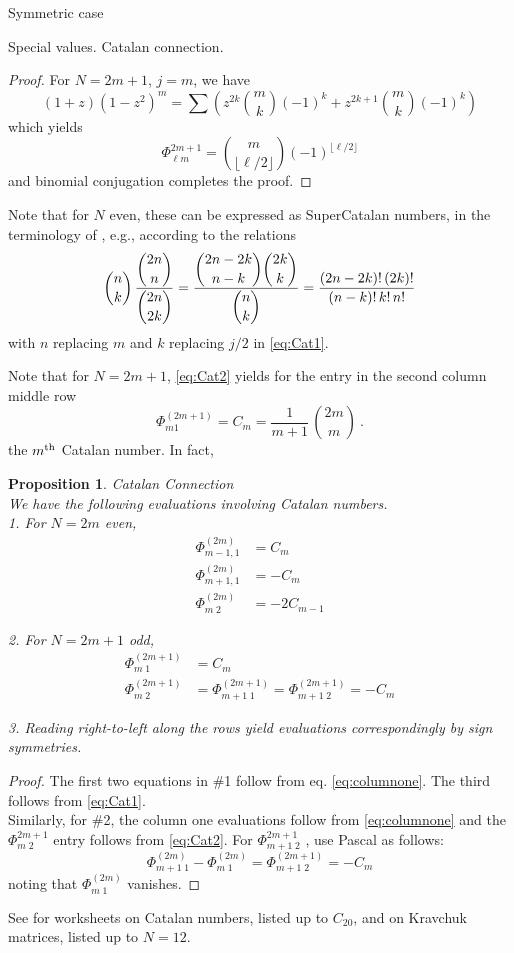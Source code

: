 \documentclass[12pt,reqno]{amsart}
\newtheorem{proposition}[theorem]{Proposition}  %
\newenvironment{remark}{{\bf Remark.\ }\rm}{\bigskip}
\newcommand{\FF}[2]{\Phi^{#1}_{#2}}
\begin{document}
\begin{section}{Symmetric case}
\begin{subsection}{Special values. Catalan connection.}
\begin{proof}
For $N=2m+1$, $j=m$, we have
$$(1+z)(1-z^2)^m=\sum \left(z^{2k}\binom{m}{k}(-1)^k+z^{2k+1}\binom{m}{k}(-1)^k\right)$$
which yields
$$\Phi_{\ell m}^{2m+1} =\binom{m}{\lfloor \ell/2\rfloor}(-1)^{\lfloor \ell/2\rfloor}$$
and binomial conjugation completes the proof.
\end{proof}
\begin{remark}
Note that for $N$ even, these can be expressed as SuperCatalan numbers, in the terminology of \cite{GMT}, e.g., according to the relations
$$\binom{n}{k}\,\frac{\dbinom{2n}{n}}{\dbinom{2n}{2k}}=\frac{\dbinom{2n-2k}{n-k}\dbinom{2k}{k}}{\dbinom{n}{k}}
=\frac{(2n-2k)!\,(2k)!}{(n-k)!\,k!\,n!}$$ 
with $n$ replacing $m$ and $k$ replacing $j/2$ in \eqref{eq:Cat1}.
\end{remark}

Note that for $N=2m+1$, \eqref{eq:Cat2} yields for
the entry in the second column middle row
$$\Phi_{m 1}^{(2m+1)}=C_m=\frac{1}{m+1}\, \binom{2m}{m}\ . $$
the $m^{\rm th}$ Catalan number. In fact,
\begin{proposition} {\rm Catalan Connection}\\
We have the following evaluations involving Catalan	numbers.\\
1. For $N=2m$ even,
\begin{align*}
\Phi_{m-1,1}^{(2m)}&=C_m\\
\Phi_{m+1,1}^{(2m)}&=-C_m\\
\Phi_{m\;2}^{(2m)}&=-2C_{m-1}
\end{align*}

2. For $N=2m+1$ odd,
\begin{align*}
\Phi_{m\;1}^{(2m+1)}&=C_m\\
\Phi_{m\;2}^{(2m+1)}&=\Phi_{m+1\;1}^{(2m+1)}=\Phi_{m+1\;2}^{(2m+1)}=-C_m
\end{align*}

3. Reading  right-to-left along the rows yield evaluations correspondingly by sign symmetries.
\end{proposition}
\begin{proof}
The first two equations in \#1 follow from eq. \eqref{eq:columnone}. The third follows from \eqref{eq:Cat1}.\\

Similarly, for \#2, the column one evaluations follow from \eqref{eq:columnone} and the $\FF{2m+1}{m\;2}$ entry follows from \eqref{eq:Cat2}.
For $\FF{2m+1}{m+1\;2}$ ,  use Pascal as follows:
$$\Phi_{m+1\;1}^{(2m)}-\Phi_{m\;1}^{(2m)}=\Phi_{m+1\;2}^{(2m+1)}=-C_m$$
noting that $\Phi_{m\;1}^{(2m)}$ vanishes.
\end{proof}

\begin{remark} See \cite{FZ} for worksheets on Catalan numbers, listed up to $C_{20}$, and on Kravchuk matrices, listed up to $N=12$.
\end{remark}
\end{subsection}
\end{section}
\end{document}
